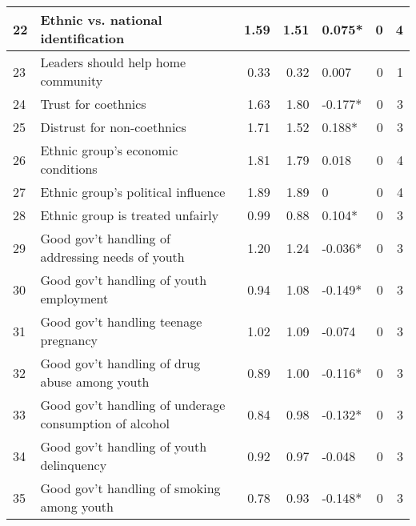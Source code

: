\begin{tabular}{l|l|r|r|l|r|r}
\hline
\hline
22 & Ethnic vs. national identification & 1.59 & 1.51 & 0.075* & 0 & 4\\
\hline
23 & Leaders should help home community & 0.33 & 0.32 & 0.007 & 0 & 1\\
\hline
24 & Trust for coethnics & 1.63 & 1.80 & -0.177* & 0 & 3\\
\hline
25 & Distrust for non-coethnics & 1.71 & 1.52 & 0.188* & 0 & 3\\
\hline
26 & Ethnic group's economic conditions & 1.81 & 1.79 & 0.018 & 0 & 4\\
\hline
27 & Ethnic group's political influence & 1.89 & 1.89 & 0 & 0 & 4\\
\hline
28 & Ethnic group is treated unfairly & 0.99 & 0.88 & 0.104* & 0 & 3\\
\hline
\hline
29 & Good gov't handling of addressing needs of youth & 1.20 & 1.24 & -0.036* & 0 & 3\\
\hline
30 & Good gov't handling of youth employment & 0.94 & 1.08 & -0.149* & 0 & 3\\
\hline
31 & Good gov't handling teenage pregnancy & 1.02 & 1.09 & -0.074 & 0 & 3\\
\hline
32 & Good gov't handling of drug abuse among youth & 0.89 & 1.00 & -0.116* & 0 & 3\\
\hline
33 & Good gov't handling of underage consumption of alcohol & 0.84 & 0.98 & -0.132* & 0 & 3\\
\hline
34 & Good gov't handling of youth delinquency & 0.92 & 0.97 & -0.048 & 0 & 3\\
\hline
35 & Good gov't handling of smoking among youth & 0.78 & 0.93 & -0.148* & 0 & 3\\
\hline
\end{tabular}
\endgroup{}
